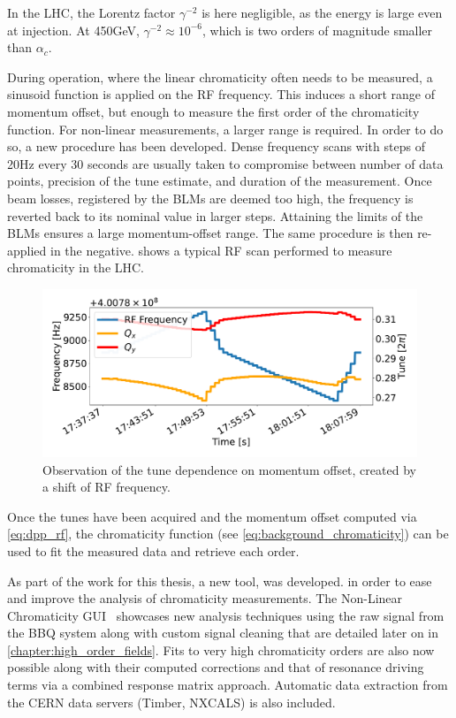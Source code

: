 In the LHC, the Lorentz factor $\gamma^{-2}$ is here negligible, as the energy is large even at
injection.  At 450GeV, $\gamma^{-2} \approx 10^{-6}$, which is two orders of magnitude smaller than
$\alpha_c$.

During operation, where the linear chromaticity often needs to be measured, a sinusoid function is
applied on the RF frequency. This induces a short range of momentum offset, but enough to measure
the first order of the chromaticity function.
For non-linear measurements, a larger range is required. In order to do so, a new procedure has been
developed. Dense frequency scans with steps of 20Hz every 30 seconds are usually taken to compromise
between number of data points, precision of the tune estimate, and duration of the measurement. Once
beam losses, registered by the BLMs are deemed too high, the frequency is reverted back to its
nominal value in larger steps. Attaining the limits of the BLMs ensures a large momentum-offset
range. The same procedure is then re-applied in the negative.  shows
a typical RF scan performed to measure chromaticity in the LHC.

\begin{figure}[H]
    \centering
    \includegraphics[width=1\textwidth]{images/rf_scan.pdf}
    \caption{Observation of the tune dependence on momentum offset, created by a shift of RF
             frequency.}
    \label{fig:measurements:rf_scan}
\end{figure}



Once the tunes have been acquired and the momentum offset computed via \cref{eq:dpp_rf}, the
chromaticity function (see \cref{eq:background_chromaticity}) can be used to fit the
measured data and retrieve each order.

As part of the work for this thesis, a new tool, was developed. in order to ease and improve the
analysis of chromaticity measurements. 
The Non-Linear Chromaticity GUI~\cite{m_le_garrec_non-linear_2022} showcases new analysis techniques
using the raw signal from the BBQ system along with custom signal cleaning that are detailed later
on in \cref{chapter:high_order_fields}. Fits to very high chromaticity orders are also now possible
along with their computed corrections and that of resonance driving terms via a combined response
matrix approach. Automatic data extraction from the CERN data servers (Timber, NXCALS) is also
included.